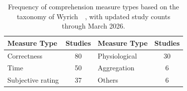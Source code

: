 \begin{table}[t]
\centering
\small
\renewcommand{\arraystretch}{1.1}
\caption{Frequency of comprehension measure types based on the taxonomy of Wyrich~\etal~\cite{Wyrich:ACS23}, with updated study counts through March 2026.}
\begin{tabular}{lclc}
\toprule
Measure Type & Studies & Measure Type & Studies \\
\midrule
Correctness & 80 & Physiological & 30 \\
Time & 50 & Aggregation & 6 \\
Subjective rating & 37 & Others & 6 \\
\bottomrule
\end{tabular}
\label{tab:measures}
\end{table}
